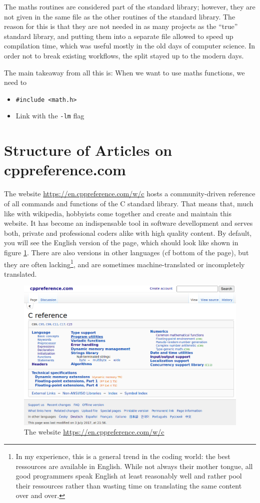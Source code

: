 The maths routines are considered part of the standard library; however, they are not given in the same file as the other routines of the standard library. The reason for this is that they are not needed in as many projects as the \enquote{true} standard library, and putting them into a separate file allowed to speed up compilation time, which was useful mostly in the old days of computer science. In order not to break existing workflows, the split stayed up to the modern days.

The main takeaway from all this is: When we want to use maths functions, we need to
\begin{itemize}
\item \texttt{\#include <math.h>}
\item Link with the \texttt{-lm} flag
\end{itemize}


\section{Structure of Articles on cppreference.com}
The website \url{https://en.cppreference.com/w/c} hosts a community-driven reference of all commands and functions of the C standard library. That means that, much like with wikipedia, hobbyists come together and create and maintain this website. It has become an indispensable tool in software devellopment and serves both, private and professional coders alike with high quality content. By default, you will see the English version of the page, which should look like shown in figure \ref{fig:cpp-home}. There are also versions in other languages (cf bottom of the page), but they are often lacking\footnote{In my experience, this is a general trend in the coding world: the best ressources are available in English. While not always their mother tongue, all good programmers speak English at least reasonably well and rather pool their ressources rather than wasting time on translating the same content over and over.}, and are sometimes machine-translated or incompletely translated.

\begin{figure}
	\includegraphics[width=\linewidth]{./gfx/cpp-home}
	\caption{The website \url{https://en.cppreference.com/w/c}} \label{fig:cpp-home}
\end{figure}

